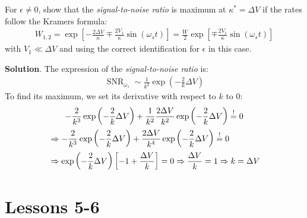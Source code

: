 \documentclass[../template.tex]{subfiles}
\begin{document}
\begin{exo}
    For $\epsilon \neq 0$, show that the \textit{signal-to-noise ratio} is maximum at $\kappa^* = \Delta V$ if the rates follow the Kramers formula:
    \begin{align*}
        W_{1,2} = \exp\left[-\frac{2 \Delta V}{\kappa} \mp \frac{2V_1}{\kappa} \sin(\omega_s t)  \right] = \frac{W}{2} \exp\left[\mp \frac{2V_1}{\kappa} \sin(\omega_s t) \right] 
    \end{align*} 
    with $V_1 \ll \Delta V$ and using the correct identification for $\epsilon$ in this case.

    \medskip

    \textbf{Solution}. The expression of the \textit{signal-to-noise ratio} is:
    \begin{align*}
        \operatorname{SNR}_{\omega_s} \sim \frac{1}{k^2} \exp\left(-\frac{2}{k} \Delta V\right)  
    \end{align*} 
    To find its maximum, we set its derivative with respect to $k$ to $0$:
    \begin{align*}
        -\frac{2}{k^3} \exp\left(-\frac{2}{k} \Delta V \right) +\frac{1}{k^2}\frac{2\Delta V}{k^2} \exp\left(-\frac{2}{k} \Delta V \right)  \overset{!}{=} 0 \span\\
        &\Rightarrow -\frac{2}{k^3} \exp\left(-\frac{2}{k} \Delta V \right)  + \frac{2 \Delta V}{k^4}  \exp\left(-\frac{2}{k} \Delta V \right) \overset{!}{=} 0\\
        &\Rightarrow \exp\left(-\frac{2}{k} \Delta V \right) \left[-1 + \frac{\Delta V}{k} \right] = 0 \Rightarrow \frac{\Delta V}{k} = 1 \Rightarrow k = \Delta V 
    \end{align*}
\end{exo}

\chapter{Lessons 5-6}
\end{document}
